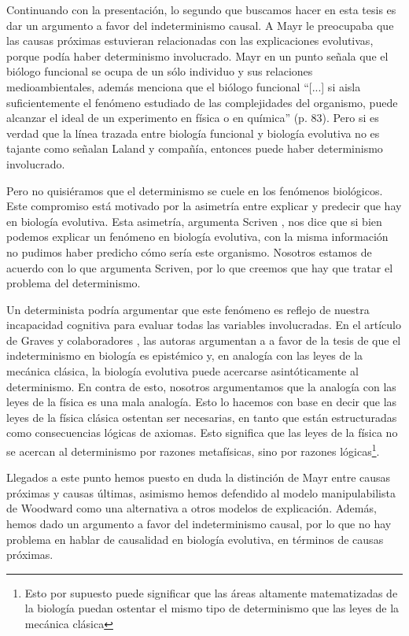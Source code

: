 Continuando con la presentación, lo segundo que buscamos hacer en esta tesis es dar un argumento a favor del indeterminismo causal. A Mayr le preocupaba que las causas próximas estuvieran relacionadas con las explicaciones evolutivas, porque podía haber determinismo involucrado. Mayr \cite{Mayr1998} en un punto señala que el biólogo funcional se ocupa de un sólo individuo y sus relaciones medioambientales, además menciona que el biólogo funcional ``[...] si aisla suficientemente el fenómeno estudiado de las complejidades del organismo, puede alcanzar el ideal de un experimento en física o en química'' (p. 83). Pero si es verdad que la línea trazada entre biología funcional y biología evolutiva no es tajante como señalan Laland y compañía, entonces puede haber determinismo involucrado.

Pero no quisiéramos que el determinismo se cuele en los fenómenos biológicos. Este compromiso está motivado por la asimetría entre explicar y predecir que hay en biología evolutiva. Esta asimetría, argumenta Scriven \citeyear{Scriven1959}, nos dice que si bien podemos explicar un fenómeno en biología evolutiva, con la misma información no pudimos haber predicho cómo sería este organismo. Nosotros estamos de acuerdo con lo que argumenta Scriven, por lo que creemos que hay que tratar el problema del determinismo.

Un determinista podría argumentar que este fenómeno es reflejo de nuestra incapacidad cognitiva para evaluar todas las variables involucradas. En el artículo de Graves y colaboradores \citeyear{Graves1999}, las autoras argumentan a a favor de la tesis de que el indeterminismo en biología es epistémico y, en analogía con las leyes de la mecánica clásica, la biología evolutiva puede acercarse asintóticamente al determinismo. En contra de esto, nosotros argumentamos que la analogía con las leyes de la física es una mala analogía. Esto lo hacemos con base en decir que las leyes de la física clásica ostentan ser necesarias, en tanto que están estructuradas como consecuencias lógicas de axiomas. Esto significa que las leyes de la física no se acercan al determinismo por razones metafísicas, sino por razones lógicas\footnote{Esto por supuesto puede significar que las áreas altamente matematizadas de la biología puedan ostentar el mismo tipo de determinismo que las leyes de la mecánica clásica}.

Llegados a este punto hemos puesto en duda la distinción de Mayr entre causas próximas y causas últimas, asimismo hemos defendido al modelo manipulabilista de Woodward como una alternativa a otros modelos de explicación. Además, hemos dado un argumento a favor del indeterminismo causal, por lo que no hay problema en hablar de causalidad en biología evolutiva, en términos de causas próximas.



